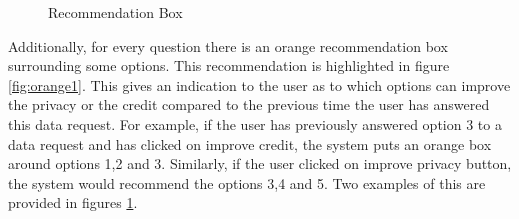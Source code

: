 \begin{figure}[htp]
  \hspace{1em}
  \caption{Recommendation Box}
  \label{fig:orange}
\end{figure}

Additionally, for every question there is an orange recommendation box surrounding some options. This recommendation is highlighted in figure \ref{fig:orange1}.
This gives an indication to the user as to which options can improve the privacy or the credit compared to the previous time the user has
answered this data request. For example, if the user has previously answered option 3 to a data request and has clicked on improve credit, the system
puts an orange box around options 1,2 and 3. Similarly, if the user clicked on improve privacy button, the system would recommend the options 3,4 and 5. Two examples of this are provided in figures \ref{fig:orange}.



